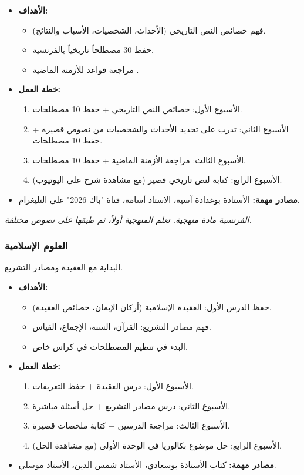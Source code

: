 \documentclass[12pt,a4paper]{book}
\newcommand{\quoteAr}[1]{%
	\begin{myquote}
		\itshape #1
	\end{myquote}
}
\begin{document}
	\begin{itemize}
		\item \textbf{الأهداف:}
		\begin{itemize}
			\item فهم خصائص النص التاريخي (الأحداث، الشخصيات، الأسباب والنتائج).
			\item حفظ 30 مصطلحاً تاريخياً بالفرنسية.
			\item مراجعة قواعد  للأزمنة الماضية .
		\end{itemize}
		\item \textbf{خطة العمل:}
		\begin{enumerate}
			\item الأسبوع الأول: خصائص النص التاريخي + حفظ 10 مصطلحات.
			\item الأسبوع الثاني: تدرب على تحديد الأحداث والشخصيات من نصوص قصيرة + حفظ 10 مصطلحات.
			\item الأسبوع الثالث: مراجعة الأزمنة الماضية + حفظ 10 مصطلحات.
			\item الأسبوع الرابع: كتابة  لنص تاريخي قصير (مع مشاهدة شرح على اليوتيوب).
		\end{enumerate}
		\item \textbf{مصادر مهمة:} الأستاذة بوغدادة آسية، الأستاذ أسامة، قناة "باك 2026" على التليغرام.
	\end{itemize}
	
	\quoteAr{الفرنسية مادة منهجية. تعلم المنهجية أولاً، ثم طبقها على نصوص مختلفة.}
	
	\subsubsection{العلوم الإسلامية}
	
	البداية مع العقيدة ومصادر التشريع.
	
	\begin{itemize}
		\item \textbf{الأهداف:}
		\begin{itemize}
			\item حفظ الدرس الأول: العقيدة الإسلامية (أركان الإيمان، خصائص العقيدة).
			\item فهم مصادر التشريع: القرآن، السنة، الإجماع، القياس.
			\item البدء في تنظيم المصطلحات في كراس خاص.
		\end{itemize}
		\item \textbf{خطة العمل:}
		\begin{enumerate}
			\item الأسبوع الأول: درس العقيدة + حفظ التعريفات.
			\item الأسبوع الثاني: درس مصادر التشريع + حل أسئلة مباشرة.
			\item الأسبوع الثالث: مراجعة الدرسين + كتابة ملخصات قصيرة.
			\item الأسبوع الرابع: حل موضوع بكالوريا في الوحدة الأولى (مع مشاهدة الحل).
		\end{enumerate}
		\item \textbf{مصادر مهمة:} كتاب الأستاذة بوسعادي، الأستاذ شمس الدين، الأستاذ موسلي.
	\end{itemize}
	
\end{document}
